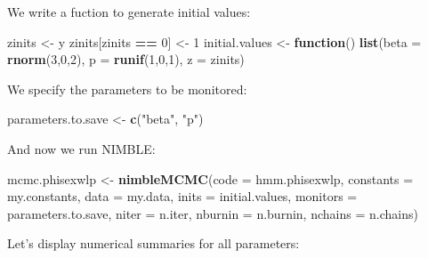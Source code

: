 \documentclass[
  12pt,
]{krantz}
\newenvironment{Shaded}{\begin{snugshade}}{\end{snugshade}}
\newcommand{\AttributeTok}[1]{\textcolor[rgb]{0.13,0.29,0.53}{#1}}
\newcommand{\ControlFlowTok}[1]{\textcolor[rgb]{0.13,0.29,0.53}{\textbf{#1}}}
\newcommand{\DecValTok}[1]{\textcolor[rgb]{0.00,0.00,0.81}{#1}}
\newcommand{\FunctionTok}[1]{\textcolor[rgb]{0.13,0.29,0.53}{\textbf{#1}}}
\newcommand{\NormalTok}[1]{#1}
\newcommand{\OtherTok}[1]{\textcolor[rgb]{0.56,0.35,0.01}{#1}}
\newcommand{\SpecialCharTok}[1]{\textcolor[rgb]{0.81,0.36,0.00}{\textbf{#1}}}
\newcommand{\StringTok}[1]{\textcolor[rgb]{0.31,0.60,0.02}{#1}}
\begin{document}
We write a fuction to generate initial values:

\begin{Shaded}
\begin{Highlighting}[]
\NormalTok{zinits }\OtherTok{\textless{}{-}}\NormalTok{ y}
\NormalTok{zinits[zinits }\SpecialCharTok{==} \DecValTok{0}\NormalTok{] }\OtherTok{\textless{}{-}} \DecValTok{1}
\NormalTok{initial.values }\OtherTok{\textless{}{-}} \ControlFlowTok{function}\NormalTok{() }\FunctionTok{list}\NormalTok{(}\AttributeTok{beta =} \FunctionTok{rnorm}\NormalTok{(}\DecValTok{3}\NormalTok{,}\DecValTok{0}\NormalTok{,}\DecValTok{2}\NormalTok{),}
                                  \AttributeTok{p =} \FunctionTok{runif}\NormalTok{(}\DecValTok{1}\NormalTok{,}\DecValTok{0}\NormalTok{,}\DecValTok{1}\NormalTok{),}
                                  \AttributeTok{z =}\NormalTok{ zinits)}
\end{Highlighting}
\end{Shaded}

We specify the parameters to be monitored:

\begin{Shaded}
\begin{Highlighting}[]
\NormalTok{parameters.to.save }\OtherTok{\textless{}{-}} \FunctionTok{c}\NormalTok{(}\StringTok{"beta"}\NormalTok{, }\StringTok{"p"}\NormalTok{)}
\end{Highlighting}
\end{Shaded}

And now we run NIMBLE:

\begin{Shaded}
\begin{Highlighting}[]
\NormalTok{mcmc.phisexwlp }\OtherTok{\textless{}{-}} \FunctionTok{nimbleMCMC}\NormalTok{(}\AttributeTok{code =}\NormalTok{ hmm.phisexwlp, }
                             \AttributeTok{constants =}\NormalTok{ my.constants,}
                             \AttributeTok{data =}\NormalTok{ my.data,              }
                             \AttributeTok{inits =}\NormalTok{ initial.values,}
                             \AttributeTok{monitors =}\NormalTok{ parameters.to.save,}
                             \AttributeTok{niter =}\NormalTok{ n.iter,}
                             \AttributeTok{nburnin =}\NormalTok{ n.burnin, }
                             \AttributeTok{nchains =}\NormalTok{ n.chains)}
\end{Highlighting}
\end{Shaded}

Let's display numerical summaries for all parameters:
\end{document}
